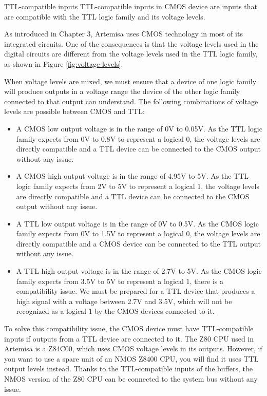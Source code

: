 \begin{theory}{TTL-compatible inputs}
    TTL-compatible inputs in CMOS device are inputs that are compatible with the TTL logic family
    and its voltage levels.

    As introduced in Chapter 3, Artemisa uses CMOS technology in most of its integrated circuits.
    One of the consequences is that the voltage levels used in the digital circuits are different
    from the voltage levels used in the TTL logic family, as shown in Figure
    \ref{fig:voltage-levels}.

    When voltage levels are mixed, we must ensure that a device of one logic family will produce
    outputs in a voltage range the device of the other logic family connected to that output can
    understand. The following combinations of voltage levels are possible between CMOS and TTL:
    
    \begin{itemize}
    \item A CMOS low output voltage is in the range of 0V to 0.05V. As the TTL logic family expects
    from 0V to 0.8V to represent a logical 0, the voltage levels are directly compatible and a TTL
    device can be connected to the CMOS output without any issue.
    \item A CMOS high output voltage is in the range of 4.95V to 5V. As the TTL logic family expects
    from 2V to 5V to represent a logical 1, the voltage levels are directly compatible and a TTL
    device can be connected to the CMOS output without any issue.
    \item A TTL low output voltage is in the range of 0V to 0.5V. As the CMOS logic family expects
    from 0V to 1.5V to represent a logical 0, the voltage levels are directly compatible and a CMOS
    device can be connected to the TTL output without any issue.
    \item A TTL high output voltage is in the range of 2.7V to 5V. As the CMOS logic family expects
    from 3.5V to 5V to represent a logical 1, there is a compatibility issue. We must be prepared
    for a TTL device that produces a high signal with a voltage between 2.7V and 3.5V, which will
    not be recognized as a logical 1 by the CMOS devices connected to it.
    \end{itemize}

    To solve this compatibility issue, the CMOS device must have TTL-compatible inputs if outputs
    from a TTL device are connected to it. The Z80 CPU used in Artemisa is a Z84C00, which uses CMOS
    voltage levels in its outputs. However, if you want to use a spare unit of an NMOS Z8400 CPU,
    you will find it uses TTL output levels instead. Thanks to the TTL-compatible inputs of the
     buffers, the NMOS version of the Z80 CPU can be connected to the system bus
    without any issue.
\end{theory}

